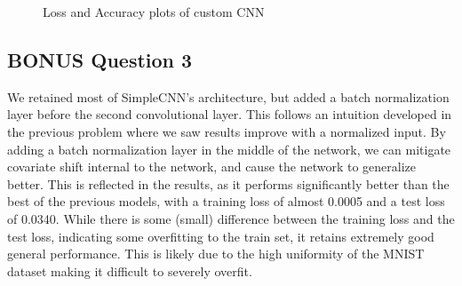 \documentclass{article}
\begin{document}
\begin{figure}[H]
    \noindent
    \label{fig3}
    \caption{Loss and Accuracy plots of custom CNN}
\end{figure}

\subsection{BONUS Question 3}
We retained most of SimpleCNN's architecture, but added a batch normalization layer before the second convolutional layer. This follows an intuition developed in the previous problem where we saw results improve with a normalized input. By adding a batch normalization layer in the middle of the network, we can mitigate covariate shift internal to the network, and cause the network to generalize better. This is reflected in the results, as it performs significantly better than the best of the previous models, with a training loss of almost 0.0005 and a test loss of 0.0340. While there is some (small) difference between the training loss and the test loss, indicating some overfitting to the train set, it retains extremely good general performance. This is likely due to the high uniformity of the MNIST dataset making it difficult to severely overfit. 
\end{document}
